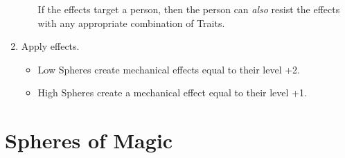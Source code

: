 \begin{multicols}{2}
\begin{enumerate}
\begin{itemize}
    If the effects target a person, then the person can \emph{also} resist the effects with any appropriate combination of Traits.
  \end{itemize}
  \item
  Apply effects.
  \begin{itemize}
    \item
    Low Spheres create mechanical effects equal to their level +2.
    \item
    High Spheres create a mechanical effect equal to their level +1.
  \end{itemize}
\end{enumerate}

\end{multicols}

\section{Spheres of Magic}

